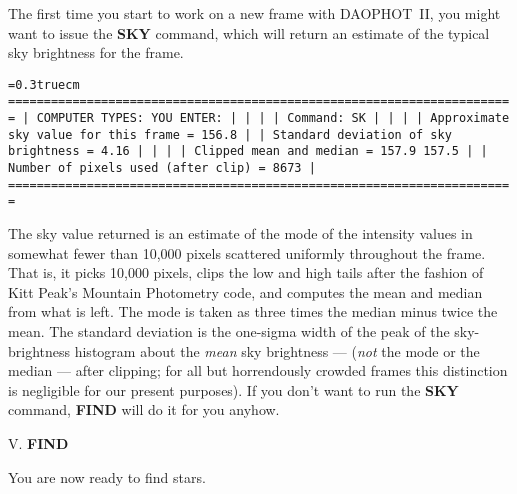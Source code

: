 The first time you start to work on a new frame with DAOPHOT~II, you
might want to issue the {\bf SKY} command, which will return an
estimate of the typical sky brightness for the frame.

\bigskip
{\noindent\obeylines\obeyspaces\frenchspacing\tt\baselineskip=0.3truecm
=======================================================================
| COMPUTER TYPES:                                      YOU ENTER:     |
|                                                                     |
| Command:                                             SK             |
|                                                                     |
|     Approximate sky value for this frame =   156.8                  |
|     Standard deviation of sky brightness =     4.16                 |
|                                                                     |
|                  Clipped mean and median =   157.9     157.5        |
|       Number of pixels used (after clip) =  8673                    |
=======================================================================
}
\bigskip

\noindent The sky value returned is an estimate of the mode of the
intensity values in somewhat fewer than 10,000 pixels scattered
uniformly throughout the frame. That is, it picks 10,000 pixels, clips
the low and high tails after the fashion of Kitt Peak's Mountain
Photometry code, and computes the mean and median from what is left.
The mode is taken as three times the median minus twice the mean.  The
standard deviation is the one-sigma width of the peak of the
sky-brightness histogram about the {\it mean\/} sky brightness ---
({\it not\/} the mode or the median --- after clipping; for all but
horrendously crowded frames this distinction is negligible for our
present purposes).  If you don't want to run the {\bf SKY} command,
{\bf FIND} will do it for you anyhow.

\vfill
\eject
\noindent V.  {\bf FIND}

You are now ready to find stars.

